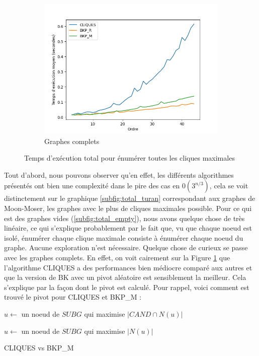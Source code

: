 \documentclass[12pt,a4paper]{article}
\begin{document}
\begin{figure}[ht]
\begin{subfigure}[b]{0.42\textwidth}
    \includegraphics[width=\textwidth]{images/total_pivot_complete_plot.png}
    \caption{Graphes complets}
    \label{subfig:total_complete}
  \end{subfigure}
  \caption{Temps d'exécution total pour énumérer toutes les cliques maximales}
  \label{fig:special_total}
\end{figure}

Tout d'abord, nous pouvons observer qu'en effet, les différents algorithmes présentés ont bien une complexité dans le pire des cas en \(0(3^{n/3})\), cela se voit distinctement sur le graphique \ref{subfig:total_turan} correspondant aux graphes de Moon-Moser, les graphes avec le plus de cliques maximales possible. Pour ce qui est des graphes vides (\ref{subfig:total_empty}), nous avons quelque chose de très linéaire, ce qui s'explique probablement par le fait que, vu que chaque noeud est isolé, énumérer chaque clique maximale consiste à énumérer chaque noeud du graphe. Aucune exploration n'est nécessaire. Quelque chose de curieux se passe avec les graphes complets. En effet, on voit cairement sur la Figure \ref{subfig:total_complete} que l'algorithme CLIQUES a des performances bien médiocre comparé aux autres et que la version de BK avec un pivot aléatoire est sensiblement la meilleur. Cela s'explique par la façon dont le pivot est calculé. Pour rappel, voici comment est trouvé le pivot pour CLIQUES et BKP\_M :

\begin{algorithm}[H]
  \begin{algorithmic}[1]
        \State $u \gets$ un noeud de $SUBG$ qui maximise $|CAND \cap N(u)|$
    \EndProcedure
  \end{algorithmic}
  \label{fig:pivot_cliques}
  \begin{algorithmic}[1]
        \State $u \gets$ un noeud de $SUBG$ qui maximise $|N(u)|$
    \EndProcedure
  \end{algorithmic}
  \caption{CLIQUES vs BKP\_M}
  \label{fig:pivot_bkp_m}
\end{algorithm}
\end{document}
